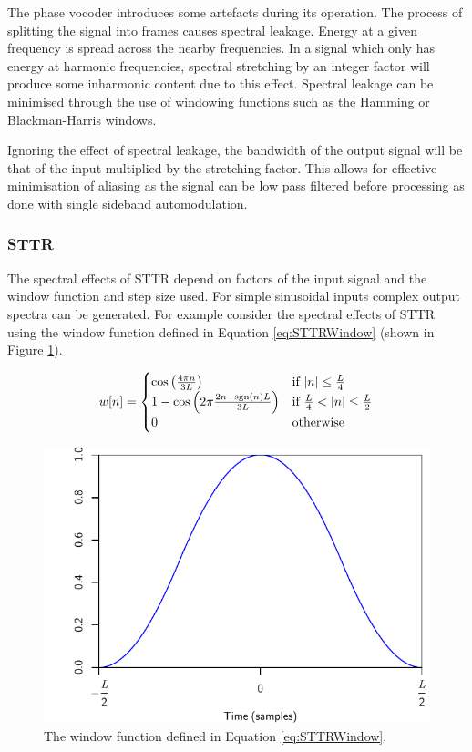 			The phase vocoder introduces some artefacts during its operation. The process of splitting the
			signal into frames causes spectral leakage. Energy at a given frequency is spread across the nearby
			frequencies. In a signal which only has energy at harmonic frequencies, spectral stretching by an
			integer factor will produce some inharmonic content due to this effect. Spectral leakage can be
			minimised through the use of windowing functions such as the Hamming or Blackman-Harris windows. 

			Ignoring the effect of spectral leakage, the bandwidth of the output signal will be that of the
			input multiplied by the stretching factor. This allows for effective minimisation of aliasing as
			the signal can be low pass filtered before processing as done with single sideband automodulation.
		
		\subsubsection*{STTR}
			The spectral effects of STTR depend on factors of the input signal and the window function and
			step size used. For simple sinusoidal inputs complex output spectra can be generated. For example
			consider the spectral effects of STTR using the window function defined in Equation
			\ref{eq:STTRWindow} (shown in Figure \ref{fig:STTRWindow}).

			\begin{equation}
				w[n] = \begin{cases}
					\cos \left( \frac{4\pi n}{3L} \right) & \text{if $\left|n\right| \leq \frac{L}{4} $} \\
					1 - \cos \left( 2\pi \frac{2n - \operatorname{sgn}(n)L}{3L} \right) &
						\text{if $\frac{L}{4} < \left|n\right| \leq \frac{L}{2}$} \\
					0 & \text{otherwise}
				\end{cases}
				\label{eq:STTRWindow}
			\end{equation}

			\begin{figure}[h!]
				\centering
				\includegraphics{chapter5/Images/STTRWindow.pdf}
				\caption{The window function defined in Equation \ref{eq:STTRWindow}.}
				\label{fig:STTRWindow}
			\end{figure}

